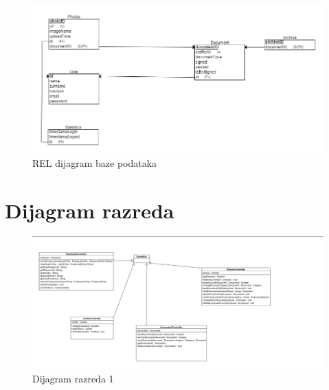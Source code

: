 					\begin{figure}[H]
					\includegraphics[scale=0.5]{slike/kompletici_v3_REL.PNG} %
					\centering
					\caption{REL dijagram baze podataka}
					\label{fig:promjene}
				\end{figure}
				
				
			
			\eject
			
			
		\section{Dijagram razreda}
		
			\begin{figure}[H]
				\includegraphics[scale=0.5]{slike/dijagram_razred1.jpeg} %
				\centering
				\caption{Dijagram razreda 1}
				\label{fig:promjene}
			\end{figure}
			
